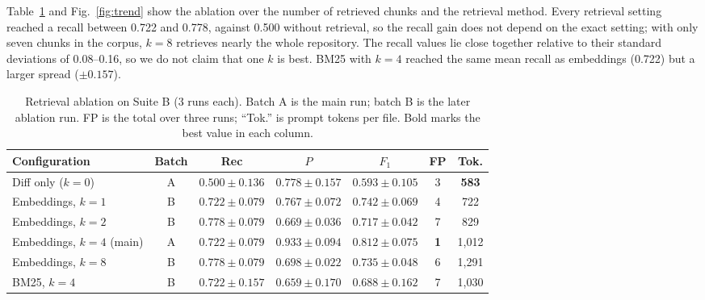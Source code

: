 \documentclass[12pt,onecolumn,draftclsnofoot]{IEEEtran}
\begin{document}
Table~\ref{tab:ablation} and Fig.~\ref{fig:trend} show the ablation over the number of retrieved chunks and the retrieval method. Every retrieval setting reached a recall between 0.722 and 0.778, against 0.500 without retrieval, so the recall gain does not depend on the exact setting; with only seven chunks in the corpus, $k=8$ retrieves nearly the whole repository. The recall values lie close together relative to their standard deviations of 0.08--0.16, so we do not claim that one $k$ is best. BM25 with $k=4$ reached the same mean recall as embeddings (0.722) but a larger spread ($\pm0.157$).

\begin{table}[!t]
\caption{Retrieval ablation on Suite B (3 runs each). Batch A is the main run; batch B is the later ablation run. FP is the total over three runs; ``Tok.'' is prompt tokens per file. Bold marks the best value in each column.}\label{tab:ablation}
\centering\scriptsize\setlength{\tabcolsep}{4pt}
\begin{tabular}{@{}lcccccc@{}}
\toprule
Configuration & Batch & Rec & $P$ & $F_1$ & FP & Tok. \\
\midrule
Diff only ($k=0$) & A & $0.500\pm0.136$ & $0.778\pm0.157$ & $0.593\pm0.105$ & 3 & \textbf{583} \\
Embeddings, $k=1$ & B & $0.722\pm0.079$ & $0.767\pm0.072$ & $0.742\pm0.069$ & 4 & 722 \\
Embeddings, $k=2$ & B & $\mathbf{0.778\pm0.079}$ & $0.669\pm0.036$ & $0.717\pm0.042$ & 7 & 829 \\
Embeddings, $k=4$ (main) & A & $0.722\pm0.079$ & $\mathbf{0.933\pm0.094}$ & $\mathbf{0.812\pm0.075}$ & \textbf{1} & 1,012 \\
Embeddings, $k=8$ & B & $\mathbf{0.778\pm0.079}$ & $0.698\pm0.022$ & $0.735\pm0.048$ & 6 & 1,291 \\
BM25, $k=4$ & B & $0.722\pm0.157$ & $0.659\pm0.170$ & $0.688\pm0.162$ & 7 & 1,030 \\
\bottomrule
\end{tabular}
\end{table}
\end{document}
